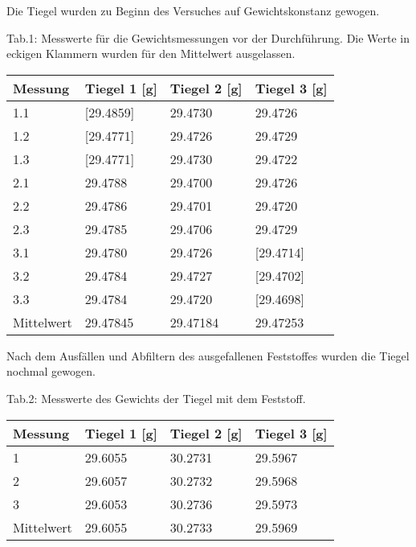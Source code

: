 \documentclass[12pt]{scrartcl} %
\begin{document}
Die Tiegel wurden zu Beginn des Versuches auf Gewichtskonstanz gewogen.
\begin{center}
  Tab.1: Messwerte für die Gewichtsmessungen vor der Durchführung. Die Werte in eckigen Klammern wurden für den Mittelwert ausgelassen.\\
  \begin{tabular}{l l l l}
      \hline
      Messung & Tiegel 1 [g] & Tiegel 2 [g] & Tiegel 3 [g]\\
      \hline
      1.1&[29.4859]&29.4730&29.4726\\
      1.2&[29.4771]&29.4726&29.4729\\
      1.3&[29.4771]&29.4730&29.4722\\
      2.1&29.4788&29.4700&29.4726\\
      2.2&29.4786&29.4701&29.4720\\
      2.3&29.4785&29.4706&29.4729\\
      3.1&29.4780&29.4726&[29.4714]\\
      3.2&29.4784&29.4727&[29.4702]\\
      3.3&29.4784&29.4720&[29.4698]\\
      \hline
      Mittelwert&29.47845&29.47184&29.47253\\
      \hline
  \end{tabular}
\end{center}

Nach dem Ausfällen und Abfiltern des ausgefallenen Feststoffes wurden die Tiegel nochmal gewogen.
\begin{center}
  Tab.2: Messwerte des Gewichts der Tiegel mit dem Feststoff.\\
  \begin{tabular}{l l l l}
    \hline
    Messung & Tiegel 1 [g] & Tiegel 2 [g] & Tiegel 3 [g]\\
    \hline
    1&29.6055&30.2731&29.5967\\
    2&29.6057&30.2732&29.5968\\
    3&29.6053&30.2736&29.5973\\
    \hline
    Mittelwert&29.6055 & 30.2733 & 29.5969\\
    \hline
  \end{tabular}
\end{center}
\end{document}
